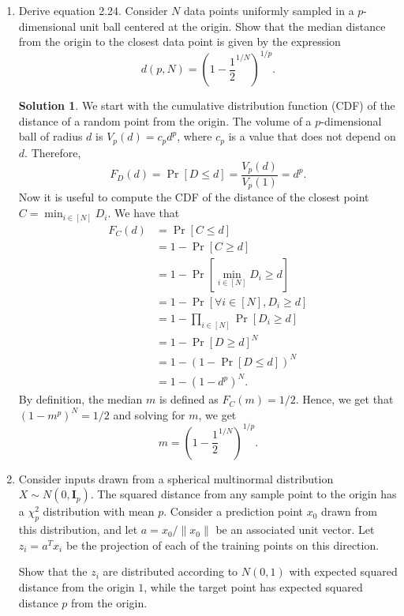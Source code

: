 \documentclass[]{book}
\theoremstyle{definition}
\newtheorem*{soln}{Solution}
\begin{document}
\begin{enumerate}
	\item\label{ex:eq2.24} Derive equation 2.24. Consider $N$ data points
	uniformly sampled in a $p$-dimensional unit ball centered at the origin.
	Show that the median distance from the origin to the closest data point is
	given by the expression $$d(p,N)=\left(1-\frac{1}{2}^{1/N}\right)^{1/p}.$$
	\begin{soln}
		We start with the cumulative distribution function (CDF) of the distance
		of a random point from the origin. The volume of a $p$-dimensional ball
		of radius $d$ is $V_p(d)=c_pd^p$, where $c_p$ is a value that does not
		depend on $d$. Therefore,
		\begin{equation}\tag{First trick to remember}
			F_D(d)=\Pr[D\le d]=\frac{V_p(d)}{V_p(1)}=d^p.
		\end{equation}
		Now it is useful to compute the CDF of the distance of the closest point
		$C=\min_{i\in[N]} D_i$. We have that
		\begin{equation}
			\begin{split}
				F_C(d) &= \Pr[C\le d] \\
				&= 1-\Pr[C\ge d] \\
				&= 1-\Pr\left[\min_{i\in[N]} D_i \ge d\right] \\
				&= 1-\Pr[\forall i\in[N], D_i \ge d] \\
				&= 1-\prod_{i\in[N]}\Pr[D_i \ge d] \\
				&= 1-\Pr[D \ge d]^N \\
				&= 1-(1-\Pr[D \le d])^N \\
				&= 1-(1-d^p)^N.
			\end{split}
		\end{equation}
		By definition, the median $m$ is defined as $F_C(m)=1/2$. Hence, we get
		that $(1-m^p)^N=1/2$ and solving for $m$, we get
		\[m=\left(1-\frac{1}{2}^{1/N}\right)^{1/p}.\]
	\end{soln}

	\item\label{ex:multi-normal} Consider inputs drawn from a spherical
	multinormal distribution $X\sim N(0,\mathbf{I}_p)$. The squared distance
	from any sample point to the origin has a $\chi_p^2$ distribution with mean
	$p$. Consider a prediction point $x_0$ drawn from this distribution, and let
	$a=x_0/\|x_0\|$ be an associated unit vector. Let $z_i=a^Tx_i$ be the
	projection of each of the training points on this direction.

	Show that the $z_i$ are distributed according to $N(0,1)$ with expected
	squared distance from the origin $1$, while the target point has expected
	squared distance $p$ from the origin.


\end{enumerate}
\end{document}
